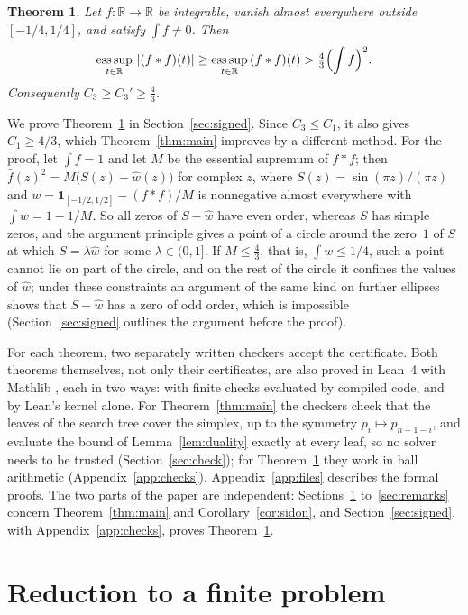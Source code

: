 \documentclass[11pt]{amsart}
\newtheorem{theorem}{Theorem}[section]
\theoremstyle{definition}
\theoremstyle{remark}
\numberwithin{equation}{section}
\newcommand{\R}{\mathbb{R}}
\newcommand{\one}{\mathbf{1}}
\newcommand{\esssup}{\operatorname*{ess\,sup}}
\newcommand{\CthrPFrac}{\tfrac43}
\newcommand{\CthrPDec}{4/3}
\begin{document}
\begin{theorem}\label{thm:signed}
Let $f\colon\R\to\R$ be integrable, vanish almost everywhere outside $[-1/4,1/4]$, and satisfy $\int f\neq0$. Then
\[
\esssup_{t\in\R}\,|(f*f)(t)|\ge\esssup_{t\in\R}\,(f*f)(t)>\CthrPFrac\Bigl(\int f\Bigr)^2.
\]
Consequently $C_3\ge C_3'\ge\CthrPFrac$.
\end{theorem}

We prove Theorem~\ref{thm:signed} in Section~\ref{sec:signed}. Since $C_3\le C_1$, it also gives $C_1\ge\CthrPDec$, which Theorem~\ref{thm:main} improves by a different method. For the proof, let $\int f=1$ and let $M$ be the essential supremum of $f*f$; then $\hat f(z)^2=M\bigl(S(z)-\hat w(z)\bigr)$ for complex $z$, where $S(z)=\sin(\pi z)/(\pi z)$ and $w=\one_{[-1/2,1/2]}-(f*f)/M$ is nonnegative almost everywhere with $\int w=1-1/M$. So all zeros of $S-\hat w$ have even order, whereas $S$ has simple zeros, and the argument principle gives a point of a circle around the zero~$1$ of $S$ at which $S=\lambda\hat w$ for some $\lambda\in(0,1]$. If $M\le\CthrPFrac$, that is, $\int w\le1/4$, such a point cannot lie on part of the circle, and on the rest of the circle it confines the values of $\hat w$; under these constraints an argument of the same kind on further ellipses shows that $S-\hat w$ has a zero of odd order, which is impossible (Section~\ref{sec:signed} outlines the argument before the proof).

For each theorem, two separately written checkers accept the certificate. Both theorems themselves, not only their certificates, are also proved in Lean~4 \cite{Lean4} with Mathlib \cite{Mathlib}, each in two ways: with finite checks evaluated by compiled code, and by Lean's kernel alone. For Theorem~\ref{thm:main} the checkers check that the leaves of the search tree cover the simplex, up to the symmetry $p_i\mapsto p_{n-1-i}$, and evaluate the bound of Lemma~\ref{lem:duality} exactly at every leaf, so no solver needs to be trusted (Section~\ref{sec:check}); for Theorem~\ref{thm:signed} they work in ball arithmetic (Appendix~\ref{app:checks}). Appendix~\ref{app:files} describes the formal proofs. The two parts of the paper are independent: Sections~\ref{sec:reduction} to~\ref{sec:remarks} concern Theorem~\ref{thm:main} and Corollary~\ref{cor:sidon}, and Section~\ref{sec:signed}, with Appendix~\ref{app:checks}, proves Theorem~\ref{thm:signed}.

\section{Reduction to a finite problem}\label{sec:reduction}
\end{document}
